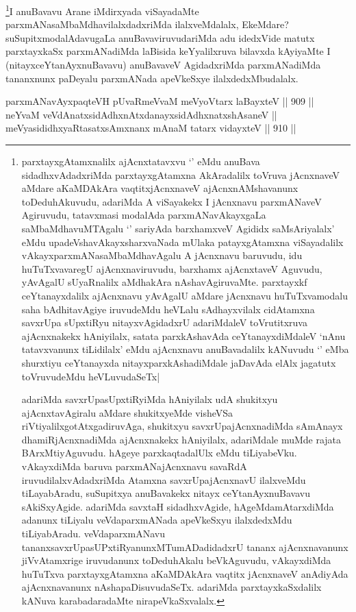 \begin{artha}
\footnote{parxtayxgAtamxnalilx ajAcnxtatavxvu `\stext' eMdu anuBava sidadhxvAdadxriMda parxtayxgAtamxna AkAradalilx toVruva jAcnxnaveV aMdare aKaMDAkAra vaqtitxjAcnxnaveV ajAcnxnAMshavanunx toDeduhAkuvudu, adariMda A viSayakekx I jAcnxnavu parxmANaveV Agiruvudu, tatavxmasi modalAda parxmANavAkayxgaLa saMbaMdhavuMTAgalu `\stext' sariyAda barxhamxveV Agididx saMsAriyalalx' eMdu upadeVshavAkayxsharxvaNada mUlaka patayxgAtamxna viSayadalilx vAkayxparxmANasaMbaMdhavAgalu A jAcnxnavu baruvudu, idu huTuTxvavaregU ajAcnxnaviruvudu, barxhamx ajAcnxtaveV Aguvudu, yAvAgalU sUyaRnalilx aMdhakAra nAshavAgiruvaMte. parxtayxkf ceYtanayxdalilx ajAcnxnavu yAvAgalU aMdare jAcnxnavu huTuTxvamodalu saha bAdhitavAgiye iruvudeMdu heVLalu sAdhayxvilalx cidAtamxna savxrUpa sUpxtiRyu nitayxvAgidadxrU adariMdaleV toVrutitxruva ajAcnxnakekx hAniyilalx, satata parxkAshavAda ceYtanayxdiMdaleV `nAnu tatavxvanunx tiLidilalx' eMdu ajAcnxnavu anuBavadalilx kANuvudu `\stext' eMba shurxtiyu ceYtanayxda nitayxparxkAshadiMdale jaDavAda elAlx jagatutx toVruvudeMdu heVLuvudaSeTx|

adariMda savxrUpasUpxtiRyiMda hAniyilalx udA shukitxyu ajAcnxtavAgiralu aMdare shukitxyeMde visheVSa riVtiyalilxgotAtxgadiruvAga, shukitxyu savxrUpajAcnxnadiMda sAmAnayx dhamiRjAcnxnadiMda ajAcnxnakekx hAniyilalx, adariMdale muMde rajata BArxMtiyAguvudu. hAgeye parxkaqtadalUlx eMdu tiLiyabeVku. vAkayxdiMda baruva parxmANajAcnxnavu savaRdA iruvudilalxvAdadxriMda Atamxna savxrUpajAcnxnavU ilalxveMdu tiLayabAradu, suSupitxya anuBavakekx nitayx ceYtanAyxnuBavavu sAkiSxyAgide. adariMda savxtaH sidadhxvAgide, hAgeMdamAtarxdiMda adanunx tiLiyalu veVdaparxmANada apeVkeSxyu ilalxdedxMdu tiLiyabAradu. veVdaparxmANavu tananxsavxrUpasUPxtiRyanunxMTumADadidadxrU tananx ajAcnxnavanunx jiVvAtamxrige iruvudanunx toDeduhAkalu beVkAguvudu, vAkayxdiMda huTuTxva parxtayxgAtamxna aKaMDAkAra vaqtitx jAcnxnaveV anAdiyAda ajAcnxnavanunx nAshapaDisuvudaSeTx. adariMda parxtayxkaSxdalilx kANuva karabadaradaMte nirapeVkaSxvalalx.}I anuBavavu Arane iMdirxyada viSayadaMte parxmANasaMbaMdhavilalxdadxriMda ilalxveMdalalx, EkeMdare? suSupitxmodalAdavugaLa anuBavaviruvudariMda adu idedxVide matutx parxtayxkaSx parxmANadiMda laBisida keYyalilxruva bilavxda kAyiyaMte I (nitayxceYtanAyxnuBavavu) anuBavaveV AgidadxriMda parxmANadiMda tananxnunx paDeyalu parxmANada apeVkeSxye ilalxdedxMbudalalx.
\end{artha}

\begin{shl}
parxmANavAyxpaqteVH pUvaRmeVvaM meVyoV\s tarx laBayxteV \hfill || 909 ||  \\
neYvaM veVdAnatxsidAdhxnAtxdanayxsidAdhxnatxshAsaneV || \\
meVyasididhxyaRtasatxsAmxnanx mAnaM tatarx vidayxteV \hfill || 910 ||  
\end{shl}

